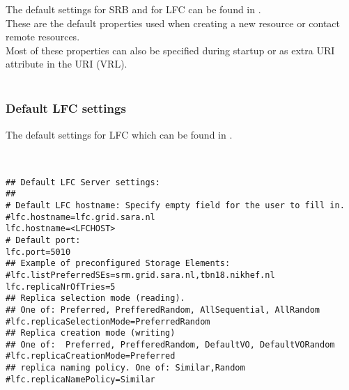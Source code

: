 The default settings for SRB and for LFC can be found in
.\\
These are the default properties used when creating a new resource or contact
remote resources.\\
Most of these properties can also be specified during startup or as extra URI
attribute in the URI (VRL).\\
\\
% 
% 
% 
% 

\subsubsection{Default LFC settings} 

The default settings for LFC which can be found in
. \\
\\
\begin{boxedlisting}
\begin{verbatim}

## Default LFC Server settings: 
## 
# Default LFC hostname: Specify empty field for the user to fill in. 
#lfc.hostname=lfc.grid.sara.nl
lfc.hostname=<LFCHOST>
# Default port: 
lfc.port=5010
## Example of preconfigured Storage Elements:
#lfc.listPreferredSEs=srm.grid.sara.nl,tbn18.nikhef.nl
lfc.replicaNrOfTries=5
## Replica selection mode (reading). 
## One of: Preferred, PrefferedRandom, AllSequential, AllRandom
#lfc.replicaSelectionMode=PreferredRandom
## Replica creation mode (writing) 
## One of:  Preferred, PrefferedRandom, DefaultVO, DefaultVORandom
#lfc.replicaCreationMode=Preferred
## replica naming policy. One of: Similar,Random 
#lfc.replicaNamePolicy=Similar

\end{verbatim} 
\end{boxedlisting}

